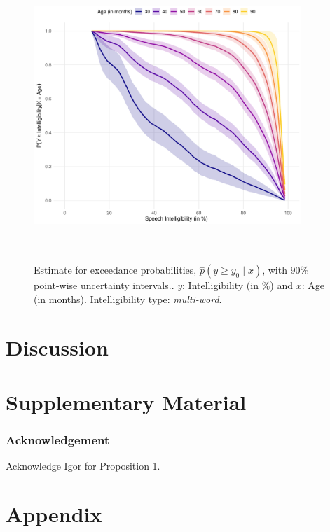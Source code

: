 \documentclass{article}[12pt]
\newcommand{\YY}{\mathcal{Y}}
\begin{document}
\begin{figure}[H]
    \centering
    \includegraphics[width = 0.9\textwidth, height = 11cm]{plots/exceedanceRDS3MultiWord.pdf}
    \caption{Estimate for exceedance probabilities, $\widehat p(y \geq y_0 \mid x)$, with $90\%$ point-wise uncertainty intervals.. $y$: Intelligibility (in $\%$) and $x$: Age (in months). Intelligibility type: \textit{multi-word}.}
    \label{fig:6}
\end{figure}

\section{Discussion}
\label{sec:disc}

\section*{Supplementary Material}



\subsubsection*{Acknowledgement}
Acknowledge Igor for Proposition 1.

\newpage 
\section*{Appendix}
\end{document}
